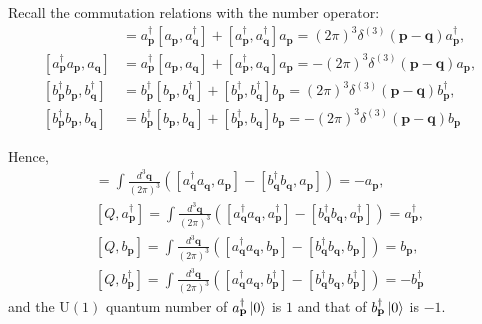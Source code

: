\documentclass[a4paper,11pt]{article}
\begin{document}
Recall the commutation relations with the number operator:
\begin{align}
    [a_{\mathbf{p}}^\dagger a_{\mathbf{p}}, a_{\mathbf{q}}^\dagger] &= a_{\mathbf{p}}^\dagger [a_{\mathbf{p}}, a_{\mathbf{q}}^\dagger] + [a_{\mathbf{p}}^\dagger, a_{\mathbf{q}}^\dagger] a_{\mathbf{p}} = (2\pi)^3\delta^{(3)}(\mathbf{p}-\mathbf{q})a_{\mathbf{p}}^\dagger,\\
    [a_{\mathbf{p}}^\dagger a_{\mathbf{p}}, a_{\mathbf{q}}] &= a_{\mathbf{p}}^\dagger [a_{\mathbf{p}}, a_{\mathbf{q}}] + [a_{\mathbf{p}}^\dagger, a_{\mathbf{q}}] a_{\mathbf{p}} = -(2\pi)^3\delta^{(3)}(\mathbf{p}-\mathbf{q})a_{\mathbf{p}},\\
    [b_{\mathbf{p}}^\dagger b_{\mathbf{p}}, b_{\mathbf{q}}^\dagger] &= b_{\mathbf{p}}^\dagger [b_{\mathbf{p}}, b_{\mathbf{q}}^\dagger] + [b_{\mathbf{p}}^\dagger, b_{\mathbf{q}}^\dagger] b_{\mathbf{p}} = (2\pi)^3\delta^{(3)}(\mathbf{p}-\mathbf{q})b_{\mathbf{p}}^\dagger,\\
    [b_{\mathbf{p}}^\dagger b_{\mathbf{p}}, b_{\mathbf{q}}] &= b_{\mathbf{p}}^\dagger [b_{\mathbf{p}}, b_{\mathbf{q}}] + [b_{\mathbf{p}}^\dagger, b_{\mathbf{q}}] b_{\mathbf{p}} = -(2\pi)^3\delta^{(3)}(\mathbf{p}-\mathbf{q})b_{\mathbf{p}}
\end{align}

Hence,
\begin{align}
    [Q, a_{\mathbf{p}}] = \int \frac{d^3\mathbf{q}}{(2\pi)^3}\left([a_{\mathbf{q}}^\dagger a_{\mathbf{q}}, a_{\mathbf{p}}] - [b_{\mathbf{q}}^\dagger b_{\mathbf{q}}, a_{\mathbf{p}}]\right) = -a_{\mathbf{p}},\\
    [Q, a_{\mathbf{p}}^\dagger] = \int \frac{d^3\mathbf{q}}{(2\pi)^3}\left([a_{\mathbf{q}}^\dagger a_{\mathbf{q}}, a_{\mathbf{p}}^\dagger] - [b_{\mathbf{q}}^\dagger b_{\mathbf{q}}, a_{\mathbf{p}}^\dagger]\right) = a_{\mathbf{p}}^\dagger,\\
    [Q, b_{\mathbf{p}}] = \int \frac{d^3\mathbf{q}}{(2\pi)^3}\left([a_{\mathbf{q}}^\dagger a_{\mathbf{q}}, b_{\mathbf{p}}] - [b_{\mathbf{q}}^\dagger b_{\mathbf{q}}, b_{\mathbf{p}}]\right) = b_{\mathbf{p}},\\
    [Q, b_{\mathbf{p}}^\dagger] = \int \frac{d^3\mathbf{q}}{(2\pi)^3}\left([a_{\mathbf{q}}^\dagger a_{\mathbf{q}}, b_{\mathbf{p}}^\dagger] - [b_{\mathbf{q}}^\dagger b_{\mathbf{q}}, b_{\mathbf{p}}^\dagger]\right) = -b_{\mathbf{p}}^\dagger
\end{align}
and the $\mathrm{U}(1)$ quantum number of $a_{\mathbf{p}}^\dagger\ket{0}$ is $1$ and that of $b_{\mathbf{p}}^\dagger\ket{0}$ is $-1$. 
\end{document}
